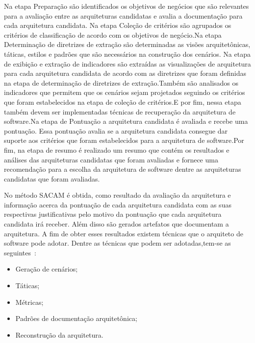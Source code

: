 Na etapa Preparação são identificados os objetivos de negócios que são relevantes para a avaliação entre as arquiteturas candidatas e avalia a documentação para cada arquitetura candidata. Na etapa Coleção de critérios são agrupados os critérios de classificação de acordo com os objetivos de negócio.Na etapa Determinação de diretrizes de extração são determinadas as visões arquitetônicas, táticas, estilos e padrões que são necessários na construção dos cenários. Na etapa de exibição e extração de indicadores são extraídas as visualizações de arquitetura para cada arquitetura candidata de acordo com as diretrizes que foram definidas na etapa de determinação de diretrizes de extração.Também são analisados os indicadores que permitem que os cenários sejam projetados seguindo os critérios que foram estabelecidos na etapa de coleção de critérios.E por fim, nessa etapa também devem ser implementadas técnicas de recuperação da arquitetura de software.Na etapa de Pontuação a arquitetura candidata é avaliada e recebe uma pontuação. Essa pontuação avalia se a arquitetura candidata consegue dar suporte aos critérios que foram estabelecidos para a arquitetura de software.Por fim, na etapa de resumo é realizado um resumo que contém os resultados e análises das arquiteturas candidatas que foram avaliadas e fornece uma recomendação para a escolha da arquitetura de software dentre as arquiteturas candidatas que foram avaliadas.

No método SACAM é obtida, como resultado da avaliação da arquitetura e informação acerca da pontuação de cada arquitetura candidata com as suas respectivas justificativas pelo motivo da pontuação que cada arquitetura candidata irá receber. Além disso são gerados artefatos que documentam a arquitetura. A fim de obter esses resultados existem técnicas que o arquiteto de software pode adotar. Dentre as técnicas que podem ser adotadas,tem-se as seguintes~\cite{SACAM}:

\begin{itemize}
    \item Geração de cenários;
    \item Táticas;
    \item Métricas;
    \item Padrões de documentação arquitetônica;
    \item Reconstrução da arquitetura.
\end{itemize}

